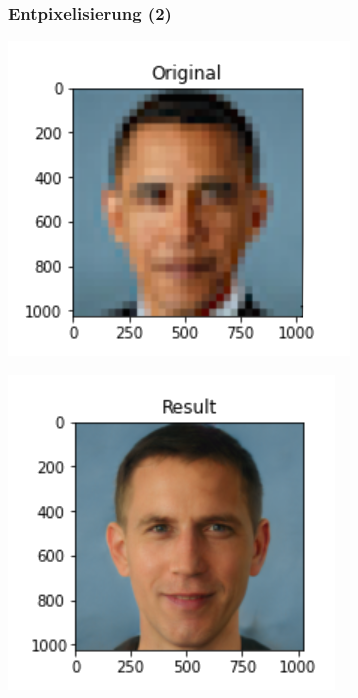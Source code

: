 \documentclass[aspectratio=169,xcolor=dvipsnames]{beamer}
\begin{document}
\begin{frame}
\frametitle{Entpixelisierung (2)}
\begin{minipage}{0.45\textwidth}
\begin{center}
\includegraphics[height=0.7\paperheight,keepaspectratio]{images/obama_depixelise1} 
\end{center}
\end{minipage}\pause \begin{minipage}{0.45\textwidth}
\begin{center}
\includegraphics[height=0.7\paperheight,keepaspectratio]{images/obama_depixelise2} 
\end{center}
\end{minipage}
\end{frame}
\end{document}
